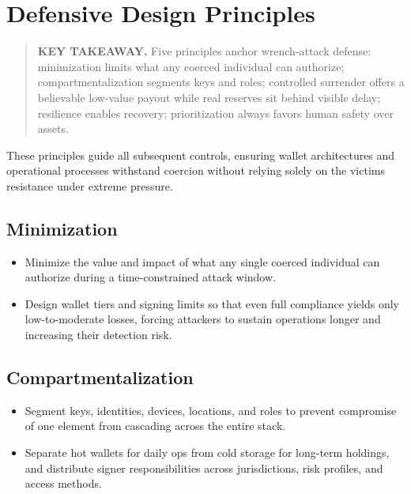 
\chapter{Defensive Design Principles}\label{defensive-design-principles}

\begin{quote}
\textbf{KEY TAKEAWAY.} Five principles anchor wrench-attack defense: minimization limits what any coerced individual can authorize; compartmentalization segments keys and roles; controlled surrender offers a believable low-value payout while real reserves sit behind visible delay; resilience enables recovery; prioritization always favors human safety over assets.
\end{quote}

These principles guide all subsequent controls, ensuring wallet architectures and operational processes withstand coercion without relying solely on the victim\textquotesingle s resistance under extreme pressure.

\section{Minimization}\label{minimization}

\begin{itemize}
\tightlist
\item
  Minimize the value and impact of what any single coerced individual can authorize during a time-constrained attack window.
\item
  Design wallet tiers and signing limits so that even full compliance yields only low-to-moderate losses, forcing attackers to sustain operations longer and increasing their detection risk.
\end{itemize}

\section{Compartmentalization}\label{compartmentalization}

\begin{itemize}
\tightlist
\item
  Segment keys, identities, devices, locations, and roles to prevent compromise of one element from cascading across the entire stack.
\item
  Separate hot wallets for daily ops from cold storage for long-term holdings, and distribute signer responsibilities across jurisdictions, risk profiles, and access methods.
\end{itemize}

